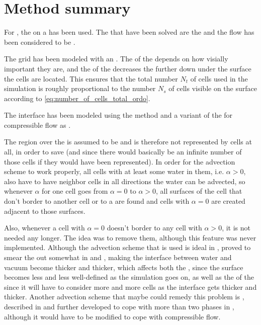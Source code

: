 \chapter{Method summary}

For \thisprojectwork, the \FVM on a  has been used. The \PDEs that have been solved are the  and the flow has been considered to be .

The grid has been modeled with an \octree. The \LOD of the  depends on how visially important they are, and the \LOD of the  decreases the further down under the surface the cells are located. This  ensures that the total number $N_t$ of cells used in the simulation is roughly proportional to the number $N_s$ of cells visible on the surface according to \eqref{eq:number_of_cells_total_ordo}.

The interface has been modeled using the \VOF method and a variant of the  for compressible flow as .

The region over the  is assumed to be \vacuum and is therefore not represented by cells at all, in order to save  (and since there would basically be an infinite number of those cells if they would have been represented). In order for the advection scheme to work properly, all cells with at least some water in them, i.e. $\alpha > 0$, also have to have neighbor cells in all directions the water can be advected, so whenever $\alpha$ for one cell goes from $\alpha = 0$ to $\alpha > 0$, all surfaces of the cell that don't border to another cell or to a  are found and cells with $\alpha = 0$ are created adjacent to those surfaces.

Also, whenever a cell with $\alpha = 0$ doesn't border to any cell with $\alpha > 0$, it is not needed any longer. The idea was to remove them, although this feature was never implemented. Although the advection scheme that is used is ideal in , proved to smear the  out somewhat in  and , making the interface between water and vacuum become thicker and thicker, which affects both the , since the surface becomes less and less well-defined as the simulation goes on, as well as the \preformance of the  since it will have to consider more and more cells as the interface gets thicker and thicker. Another advection scheme that maybe could remedy this problem is \MULES, described in \citep{Berberovi2009} and further developed to cope with more than two phases in \citep{Kissling2010}, although it would have to be modified to cope with compressible flow.
